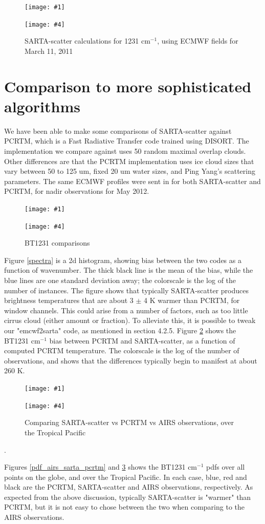 \documentclass[11pt]{article}
\newcommand{\sasc}{\textsf{SARTA-scatter}\xspace}
\newcommand{\pcrtm}{\textsf{PCRTM}\xspace}
\newcommand{\dfigure}[6]
{
\begin{figure}
  \begin{minipage}[t]{0.45\textwidth}
  \centering
  \texttt{[image: \#1]}
   \caption{#2}  \label{#3}
  \end{minipage}
  \hfil
  \begin{minipage}[t]{0.45\linewidth}
  \centering
  \texttt{[image: \#4]}
   \caption{#5}  \label{#6}
  \end{minipage}
\end{figure}
}
\newcommand{\wn}{cm$^{-1}$\xspace}
\begin{document}
\dfigure{Figs/airs_bt_image}{AIRS BT1231 \wn observations for March 11, 2011}{AIRS_obs_March2011}{Figs/ecmwf_bt_image}{\sasc calculations for 1231 \wn, using ECMWF fields for March 11, 2011}{SARTA_calc_March2011}

\section{Comparison to more sophisticated algorithms}

We have been able to make some comparisons of \sasc against \pcrtm, which is a Fast Radiative Transfer code trained using 
DISORT. The implementation we compare against uses 50 random maximal overlap clouds. Other differences are that 
the \pcrtm implementation uses ice cloud sizes that vary between 50 to 125 um, fixed 20 um water sizes, and 
Ping Yang's scattering parameters. The same ECMWF profiles were sent in for both \sasc and \pcrtm, for nadir 
observations for May 2012.

\dfigure{Figs/spectra_sartaVSpcrtm.jpg}{Comparing \sasc vs \pcrtm}{spectra}{Figs/pcrtm_calc_vs_sarta_bias}{BT1231 comparisons}{bt1231_sarta_pcrtm}

Figure \ref{spectra} is a 2d histogram, showing bias between the two codes as a function of wavenumber. The thick 
black line is the mean of the bias, while the blue lines are one standard deviation away; the colorscale is the 
log of the number of instances. The figure shows that typically \sasc produces brightness temperatures that are about 
3 $\pm$ 4 K warmer than \pcrtm, for window channels. This could arise from a number of factors, such as too 
little cirrus cloud (either amount or fraction). To alleviate this, it is possible to tweak our 
"emcwf2sarta" code, as mentioned in section 4.2.5. Figure \ref{bt1231_sarta_pcrtm} shows the BT1231 \wn bias between
\pcrtm and \sasc, as a function of computed \pcrtm temperature. The colorscale is the log of the number of
observations, and shows that the differences typically begin to manifest at about 260 K.

\dfigure{Figs/pcrtm_vs_sarta_vs_obs_pdf1231_allregions.jpg}{Comparing \sasc vs \pcrtm vs AIRS observations, over all the globe}{pdf_airs_sarta_pcrtm}{Figs/pcrtm_vs_sarta_vs_obs_pdf1231_pacific.jpg}{Comparing \sasc vs \pcrtm vs AIRS observations, over the Tropical Pacific}{pdf_airs_sarta_pcrtm_tropical_pacific}. 

Figures \ref{pdf_airs_sarta_pcrtm} and \ref{pdf_airs_sarta_pcrtm_tropical_pacific} shows 
the BT1231 \wn pdfs over all points on the globe, and over the Tropical Pacific. In each case, blue, red 
and black are the \pcrtm, \sasc and AIRS observations, respectively. As expected from the above discussion,
typically \sasc is "warmer" than \pcrtm, but it is not easy to chose between the two when comparing to the 
AIRS observations.
\end{document}
